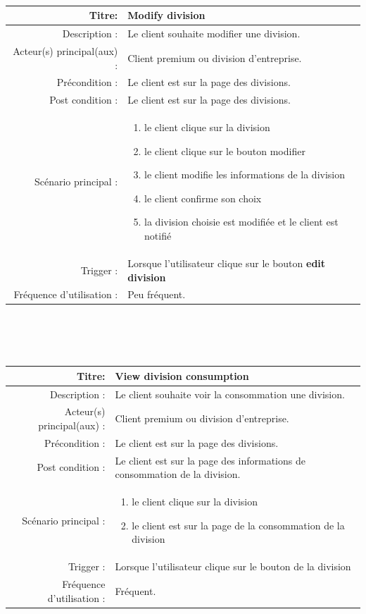 \documentclass{report}
\begin{document}
\\\\\\
\begin{tabular}{|r|p{9cm}|}
    \hline
    Titre: & Modify division \\
    \hline
    Description : & Le client souhaite modifier une division. \\
    \hline
    Acteur(s) principal(aux) : & Client premium ou division d'entreprise. \\
    \hline
    Précondition : & Le client est sur la page des divisions. \\
    \hline
    Post condition : & Le client est sur la page des divisions. \\
    \hline
    Scénario principal : & \begin{enumerate}[left=0pt, topsep=0pt]
        \item le client clique sur la division
        \item le client clique sur le bouton modifier
        \item le client modifie les informations de la division
        \item le client confirme son choix
        \item la division choisie est modifiée et le client est notifié 
    \end{enumerate} \nointerlineskip\\
    \hline
    Trigger : & Lorsque l'utilisateur clique sur le bouton \textbf{edit division} \\ 
    \hline
    Fréquence d'utilisation : & Peu fréquent. \\
    \hline
\end{tabular}
\\\\\\
\begin{tabular}{|r|p{9cm}|}
    \hline
    Titre: & View division consumption \\
    \hline
    Description : & Le client souhaite voir la consommation une division. \\
    \hline
    Acteur(s) principal(aux) : & Client premium ou division d'entreprise. \\
    \hline
    Précondition : & Le client est sur la page des divisions. \\
    \hline
    Post condition : & Le client est sur la page des informations de consommation de la division. \\
    \hline
    Scénario principal : & \begin{enumerate}[left=0pt, topsep=0pt]
        \item le client clique sur la division
        \item le client est sur la page de la consommation de la division 
    \end{enumerate} \nointerlineskip\\
    \hline
    Trigger : & Lorsque l'utilisateur clique sur le bouton de la division \\ 
    \hline
    Fréquence d'utilisation : & Fréquent. \\
    \hline
\end{tabular}
\end{document}
